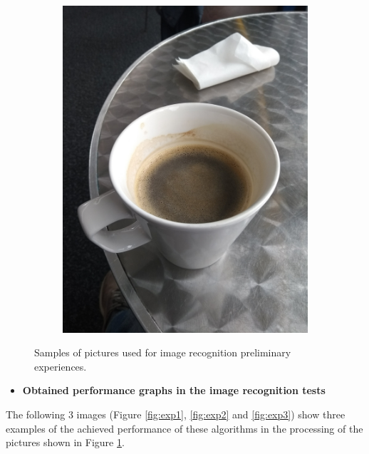 \begin{figure}[H]
\begin{subfigure}{0.35\textwidth}
    \caption{} 
  \end{subfigure}
    \begin{subfigure}{0.1968\textwidth}
    \includegraphics[width=\textwidth]{Sections/4InitialWork/4_images/run4_pic.jpg}
    \caption{}
   
  \end{subfigure}
  
    \caption{Samples of pictures used for image recognition preliminary experiences.}
    \label{fig:experi}
    \end{figure}


    \begin{itemize}
      \item \textbf{Obtained performance graphs in the image recognition tests}
    \end{itemize}
    
The following 3 images (Figure \ref{fig:exp1}, \ref{fig:exp2} and \ref{fig:exp3}) show three examples of the achieved performance of these algorithms in the processing of the pictures shown in Figure \ref{fig:experi}.

